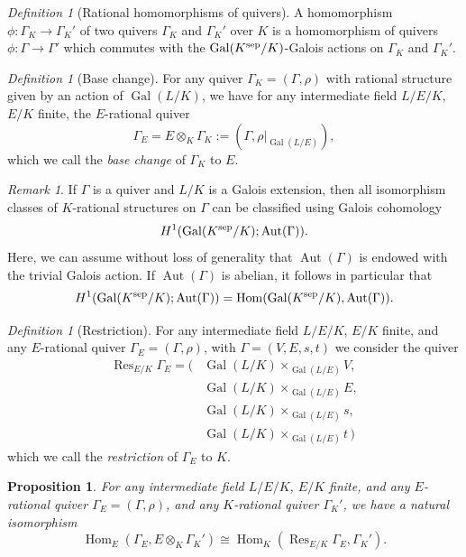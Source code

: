 \documentclass[a4paper,12pt,reqno]{amsart}
\DeclareMathOperator{\Aut}{\mathrm{Aut}}
\DeclareMathOperator{\Hom}{\mathrm{Hom}}
\DeclareMathOperator{\Gal}{\mathrm {Gal}}
\DeclareMathOperator{\res}{\mathrm{Res}}
\theoremstyle{plain}
\newtheorem{proposition}[theorem]{Proposition}
\theoremstyle{remark}
\newtheorem{remark}[theorem]{Remark}
\newtheorem{definition}[theorem]{Definition}
\begin{document}
\begin{definition}[Rational homomorphisms of quivers]\label{def:rationalquiverhom}
  A homomorphism $\phi\colon\Gamma_K\to \Gamma_K'$ of two quivers $\Gamma_K$ and $\Gamma_K'$ over $K$ is a homomorphism of quivers $\phi\colon\Gamma\to\Gamma'$ which commutes with the $\Gal(K^{\rm sep}/K)$-Galois actions on $\Gamma_K$ and $\Gamma_K'$.
\end{definition}

\begin{definition}[Base change]\label{def:quiverbasechange}
  For any quiver $\Gamma_K=(\Gamma,\rho)$ with rational structure given by an action of $\Gal(L/K)$, we have for any intermediate field $L/E/K$, $E/K$ finite, the $E$-rational quiver
  \[
  \Gamma_E=E\otimes_K\Gamma_K:=(\Gamma,\rho|_{\Gal(L/E)}),
  \]
  which we call the {\em base change} of $\Gamma_K$ to $E$.
\end{definition}

\begin{remark}
  If $\Gamma$ is a quiver and $L/K$ is a Galois extension, then all isomorphism classes of $K$-rational structures on $\Gamma$ can be classified using Galois cohomology
  \[
  H^1(\Gal(K^{\rm sep}/K);\Aut(\Gamma)).
  \]
  Here, we can assume without loss of generality that $\Aut(\Gamma)$ is endowed with the trivial Galois action. If $\Aut(\Gamma)$ is abelian, it follows in particular that
  \[
  H^1(\Gal(K^{\rm sep}/K);\Aut(\Gamma))=\Hom(\Gal(K^{\rm sep}/K),\Aut(\Gamma)).
  \]
\end{remark}

\begin{definition}[Restriction]\label{def:quiverrestriction}
  For any intermediate field $L/E/K$, $E/K$ finite, and any $E$-rational quiver $\Gamma_E=(\Gamma,\rho)$, with $\Gamma=(V,E,s,t)$ we consider the quiver
  \begin{align*}
    \res_{E/K}\Gamma_E=(&\Gal(L/K)\times_{\Gal(L/E)}V,\\
    &\Gal(L/K)\times_{\Gal(L/E)}E,\\
    &\Gal(L/K)\times_{\Gal(L/E)}s,\\
    &\Gal(L/K)\times_{\Gal(L/E)}t\,)
  \end{align*}
  which we call the {\em restriction} of $\Gamma_E$ to $K$.
\end{definition}

\begin{proposition}\label{prop:quiverrestrictionbasechangeadjunction}
  For any intermediate field $L/E/K$, $E/K$ finite, and any $E$-rational quiver $\Gamma_E=(\Gamma,\rho)$, and any $K$-rational quiver $\Gamma_K'$, we have a natural isomorphism
  \begin{equation}
    \Hom_{E}(\Gamma_E,E\otimes_K\Gamma_K')\cong
    \Hom_{K}(\res_{E/K}\Gamma_E,\Gamma_K').
  \end{equation}
\end{proposition}
\end{document}
